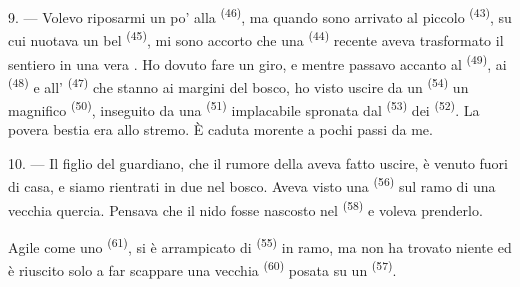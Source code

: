 \VUsaut{3.0mm}
\VUsaut{3.0mm}

9. --- Volevo riposarmi un po' alla  \textsuperscript{(46)},
ma quando sono arrivato al piccolo  \textsuperscript{(43)}, su cui
nuotava un bel  \textsuperscript{(45)}, mi sono accorto che una
 \textsuperscript{(44)} recente aveva trasformato il sentiero in una
vera . Ho dovuto fare un giro, e mentre passavo accanto al
 \textsuperscript{(49)}, ai  \textsuperscript{(48)} e
all' \textsuperscript{(47)} che stanno ai margini del bosco, ho visto
uscire da un  \textsuperscript{(54)} un magnifico 
\textsuperscript{(50)}, inseguito da una  \textsuperscript{(51)}
implacabile spronata dal  \textsuperscript{(53)} dei  \textsuperscript{(52)}. La povera bestia era allo stremo. È caduta morente
a pochi passi da me.

10. --- Il figlio del guardiano, che il rumore della  aveva fatto
uscire, è venuto fuori di casa, e siamo rientrati in due nel bosco. Aveva visto una
 \textsuperscript{(56)} sul ramo di una vecchia quercia. Pensava che il
nido fosse nascosto nel  \textsuperscript{(58)} e voleva prenderlo.

Agile come uno  \textsuperscript{(61)}, si è arrampicato di
 \textsuperscript{(55)} in ramo, ma non ha trovato niente ed è riuscito
solo a far scappare una vecchia  \textsuperscript{(60)} posata su un
 \textsuperscript{(57)}.
\VUsaut{4.0mm}
\VUfilet{22mm}
